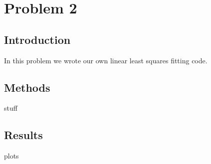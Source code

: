 \documentclass[11pt]{article}
\begin{document}
\section*{Problem 2}
\subsection*{Introduction}
In this problem we wrote our own linear least squares fitting code. 

\subsection*{Methods}
stuff

\subsection*{Results}
plots
\end{document}

